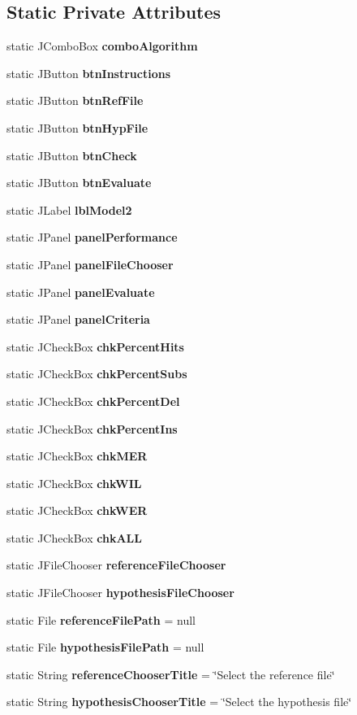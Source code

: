 \subsection*{Static Private Attributes}
\begin{DoxyCompactItemize}
\item 
static J\+Combo\+Box {\bf combo\+Algorithm}
\item 
static J\+Button {\bf btn\+Instructions}
\item 
static J\+Button {\bf btn\+Ref\+File}
\item 
static J\+Button {\bf btn\+Hyp\+File}
\item 
static J\+Button {\bf btn\+Check}
\item 
static J\+Button {\bf btn\+Evaluate}
\item 
static J\+Label {\bf lbl\+Model2}
\item 
static J\+Panel {\bf panel\+Performance}
\item 
static J\+Panel {\bf panel\+File\+Chooser}
\item 
static J\+Panel {\bf panel\+Evaluate}
\item 
static J\+Panel {\bf panel\+Criteria}
\item 
static J\+Check\+Box {\bf chk\+Percent\+Hits}
\item 
static J\+Check\+Box {\bf chk\+Percent\+Subs}
\item 
static J\+Check\+Box {\bf chk\+Percent\+Del}
\item 
static J\+Check\+Box {\bf chk\+Percent\+Ins}
\item 
static J\+Check\+Box {\bf chk\+M\+E\+R}
\item 
static J\+Check\+Box {\bf chk\+W\+I\+L}
\item 
static J\+Check\+Box {\bf chk\+W\+E\+R}
\item 
static J\+Check\+Box {\bf chk\+A\+L\+L}
\item 
static J\+File\+Chooser {\bf reference\+File\+Chooser}
\item 
static J\+File\+Chooser {\bf hypothesis\+File\+Chooser}
\item 
static File {\bf reference\+File\+Path} = null
\item 
static File {\bf hypothesis\+File\+Path} = null
\item 
static String {\bf reference\+Chooser\+Title} = \char`\"{}Select the reference file\char`\"{}
\item 
static String {\bf hypothesis\+Chooser\+Title} = \char`\"{}Select the hypothesis file\char`\"{}

\end{DoxyCompactItemize}
